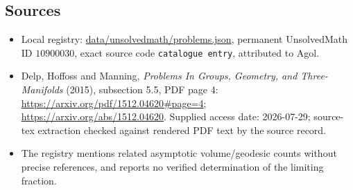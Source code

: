 \documentclass[11pt]{article}
\begin{document}
\subsection{Sources}
\begin{itemize}
\item Local registry: \url{data/unsolvedmath/problems.json}, permanent UnsolvedMath ID $10900030$, exact source code \texttt{catalogue entry}, attributed to Agol.
\item Delp, Hoffoss and Manning, \emph{Problems In Groups, Geometry, and Three-Manifolds} (2015), subsection 5.5, PDF page 4: \url{https://arxiv.org/pdf/1512.04620#page=4}; \url{https://arxiv.org/abs/1512.04620}. Supplied access date: 2026-07-29; source-tex extraction checked against rendered PDF text by the source record.
\item The registry mentions related asymptotic volume/geodesic counts without precise references, and reports no verified determination of the limiting fraction.
\end{itemize}
\end{document}
